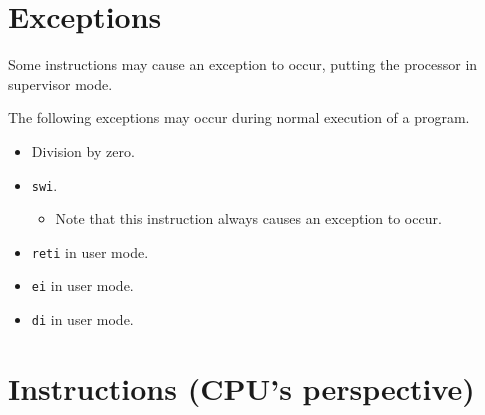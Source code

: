 \documentclass{article}
\begin{document}
\newpage
\section{Exceptions}
	Some instructions may cause an exception to occur, putting the
	processor in supervisor mode.

	The following exceptions may occur during normal execution of a
	program.

	\begin{itemize}
	\item Division by zero.
	\item \texttt{swi}.
		\begin{itemize}
		\item Note that this instruction always causes an exception to
			occur.
		\end{itemize}
	\item \texttt{reti} in user mode.
	\item \texttt{ei} in user mode.
	\item \texttt{di} in user mode.
	\end{itemize}

\newpage
\section{Instructions (CPU's perspective)}
\end{document}
